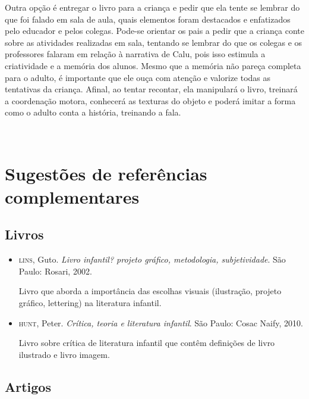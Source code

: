 \documentclass[11pt]{extarticle}
\begin{document}
\begin{enumerate}
Outra opção é entregar o livro para a criança e pedir que ela tente se lembrar
do que foi falado em sala de aula, quais elementos foram destacados e enfatizados pelo educador e pelos colegas. Pode-se orientar os pais a pedir que a criança conte sobre as atividades realizadas em sala, tentando se lembrar do que os colegas e os professores falaram em relação à narrativa de Calu, pois isso estimula a criatividade e a memória dos alunos. Mesmo que a memória não pareça 
completa para o adulto, é importante que ele ouça com atenção e 
valorize todas as tentativas da criança. Afinal, ao tentar recontar, 
ela manipulará o livro, treinará a coordenação motora, conhecerá as texturas 
do objeto e poderá imitar a forma como o adulto 
conta a história, treinando a fala. 
\end{enumerate}

 
\section{Sugestões de referências complementares}

\subsection{Livros} 

\begin{itemize}
\item \textsc{lins}, Guto. \textit{Livro infantil? projeto gráfico, metodologia, subjetividade}. São Paulo: Rosari, 2002.

Livro que aborda a importância das escolhas visuais (ilustração, projeto gráfico, lettering) na literatura infantil.  

\item \textsc{hunt}, Peter. \textit{Crítica, teoria e literatura infantil}. São Paulo: Cosac Naify, 2010.

Livro sobre crítica de literatura infantil que contêm definições de livro ilustrado e livro imagem. 
\end{itemize}

\subsection{Artigos}
\end{document}

